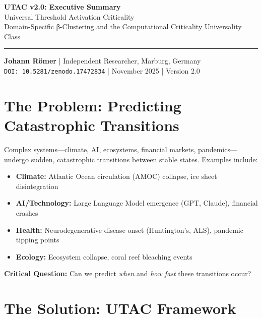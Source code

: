 \documentclass[11pt,a4paper]{article}
\begin{document}
\begin{center}
{\LARGE\textbf{UTAC v2.0: Executive Summary}}\\[0.5em]
{\large Universal Threshold Activation Criticality}\\
{\large Domain-Specific β-Clustering and the Computational Criticality Universality Class}\\[0.5em]
\hrule
\vspace{0.5em}
\textbf{Johann Römer} | Independent Researcher, Marburg, Germany\\
\texttt{DOI: 10.5281/zenodo.17472834} | November 2025 | Version 2.0\\
\end{center}

\section*{The Problem: Predicting Catastrophic Transitions}

Complex systems—climate, AI, ecosystems, financial markets, pandemics—undergo sudden, catastrophic transitions between stable states. Examples include:

\begin{itemize}
\item \textbf{Climate:} Atlantic Ocean circulation (AMOC) collapse, ice sheet disintegration
\item \textbf{AI/Technology:} Large Language Model emergence (GPT, Claude), financial crashes
\item \textbf{Health:} Neurodegenerative disease onset (Huntington's, ALS), pandemic tipping points
\item \textbf{Ecology:} Ecosystem collapse, coral reef bleaching events
\end{itemize}

\textbf{Critical Question:} Can we predict \textit{when} and \textit{how fast} these transitions occur?

\section*{The Solution: UTAC Framework}
\end{document}
